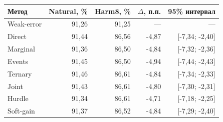 \begin{tabular}{lrrrr}
\toprule
Метод & Natural, \% & Harm8, \% & $\Delta$, п.п. & 95\% интервал \\
\midrule
Weak-error & 91{,}26 & 91{,}25 & --- & --- \\
Direct & 91{,}44 & 86{,}56 & -4{,}87 & [-7{,}34; -2{,}40] \\
Marginal & 91{,}36 & 86{,}50 & -4{,}84 & [-7{,}32; -2{,}36] \\
Events & 91{,}45 & 86{,}50 & -4{,}94 & [-7{,}44; -2{,}43] \\
Ternary & 91{,}46 & 86{,}61 & -4{,}84 & [-7{,}34; -2{,}33] \\
Joint & 91{,}43 & 86{,}61 & -4{,}80 & [-7{,}30; -2{,}31] \\
Hurdle & 91{,}34 & 86{,}61 & -4{,}71 & [-7{,}18; -2{,}25] \\
Soft-gain & 91{,}37 & 86{,}52 & -4{,}84 & [-7{,}29; -2{,}40] \\
\bottomrule
\end{tabular}
